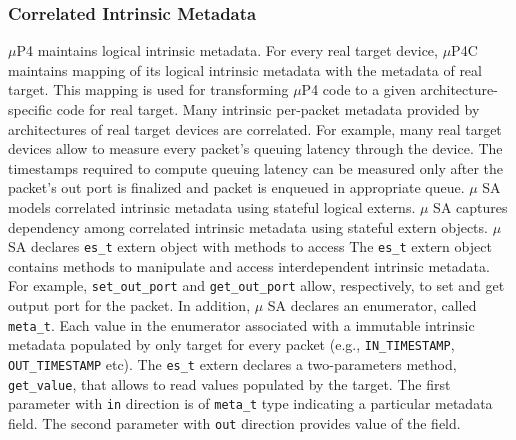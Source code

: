 \subsubsection{Correlated Intrinsic Metadata}
$\mu$P4 maintains logical intrinsic metadata.
For every real target device, $\mu$P4C maintains mapping of its logical intrinsic metadata with the metadata of real target.
This mapping is used for transforming $\mu$P4 code to a given architecture-specific code for real target.
Many intrinsic per-packet metadata provided by architectures of real target devices are correlated.
For example, many real target devices allow to measure every packet's queuing latency through the device.
The timestamps required to compute queuing latency can be measured only after the packet's out port is finalized and packet is enqueued in appropriate queue.
$\mu$ SA models correlated intrinsic metadata using stateful logical externs.
$\mu$ SA captures dependency among correlated intrinsic metadata using stateful extern objects.
$\mu$ SA declares \texttt{es\_t} extern object with methods to access 
The \texttt{es\_t} extern object contains methods to manipulate and access interdependent intrinsic metadata.
For example, \texttt{set\_out\_port} and \texttt{get\_out\_port} allow, respectively, to set and get output port for the packet.
In addition, $\mu$ SA declares an enumerator, called \texttt{meta\_t}.
Each value in the enumerator associated with a immutable intrinsic metadata populated by only target for every packet (e.g., \texttt{IN\_TIMESTAMP}, \texttt{OUT\_TIMESTAMP} etc).
The \texttt{es\_t} extern declares a two-parameters method, \texttt{get\_value}, that allows to read values populated by the target.
The first parameter with \texttt{in} direction is of \texttt{meta\_t} type indicating a particular metadata field.
The second parameter with \texttt{out} direction provides value of the field.



